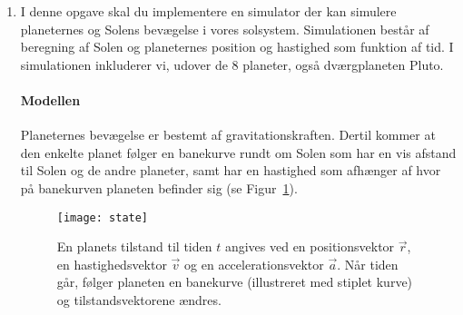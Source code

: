 \documentclass{article}
\begin{document}
\begin{enumerate}[label=11g.\arabic*,start=0]
\item I denne opgave skal du implementere en simulator der kan simulere planeternes og Solens bevægelse i vores solsystem.  Simulationen består af beregning af Solen og planeternes position og hastighed som funktion af tid. I simulationen inkluderer vi, udover de 8 planeter, også dværgplaneten Pluto.

\paragraph{Modellen}
Planeternes bevægelse er bestemt af gravitationskraften. Dertil kommer at den enkelte planet følger en banekurve rundt om Solen som har en vis afstand til Solen og de andre planeter, samt har en hastighed som afhænger af hvor på banekurven planeten befinder sig (se Figur~\ref{fig:2-legeme}).
\begin{figure}
  \begin{center}
    \texttt{[image: state]}
    \caption{En planets tilstand til tiden $t$ angives ved en positionsvektor $\vec{r}$, en hastighedsvektor $\vec{v}$ og en accelerationsvektor $\vec{a}$. Når tiden går, følger planeten en banekurve (illustreret med stiplet kurve) og tilstandsvektorene ændres.}
    \label{fig:2-legeme}
  \end{center}
\end{figure}


\end{enumerate}
\end{document}
